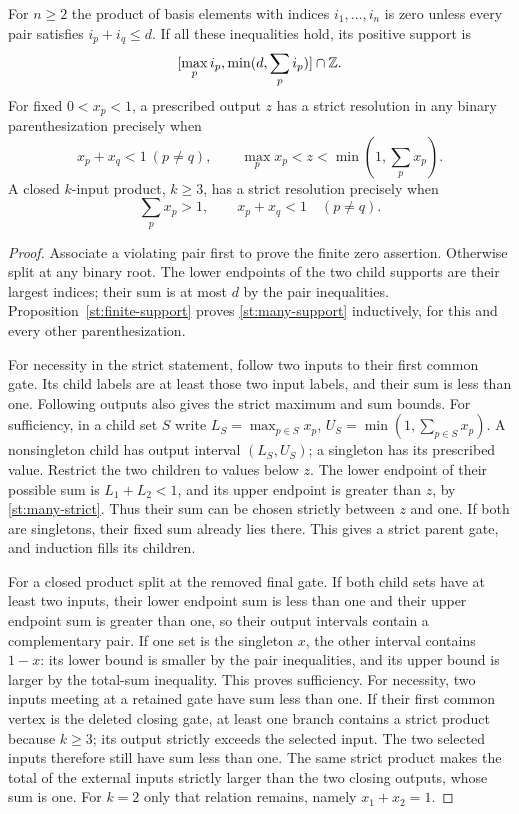\begin{lemma}\label{st:hub-support}
For $n\ge2$ the product of basis elements with indices $i_1,\ldots,i_n$
is zero unless every pair satisfies $i_p+i_q\le d$. If all
these inequalities hold, its positive support is
\begin{equation}\label{st:many-support}
 [\max_p i_p,\min(d,\sum_p i_p)]\cap\mathbb Z.
\end{equation}
For fixed $0<x_p<1$, a prescribed output $z$ has a strict
resolution in any binary parenthesization precisely when
\begin{equation}\label{st:many-strict}
 x_p+x_q<1\ (p\ne q),\qquad
 \max_p x_p<z<\min(1,\sum_p x_p).
\end{equation}
A closed $k$-input product, $k\ge3$, has a strict resolution
precisely when
\begin{equation}\label{st:closed-hub}
 \sum_p x_p>1,\qquad x_p+x_q<1\quad(p\ne q).
\end{equation}
\end{lemma}
\begin{proof}
Associate a violating pair first to prove the finite zero
assertion. Otherwise split at any binary root. The lower
endpoints of the two child supports are their largest indices;
their sum is at most $d$ by the pair inequalities.
Proposition~\ref{st:finite-support} proves
\eqref{st:many-support} inductively, for this and every other
parenthesization.

For necessity in the strict statement, follow two inputs to
their first common gate. Its child labels are at least those
two input labels, and their sum is less than one. Following
outputs also gives the strict maximum and sum bounds.
For sufficiency, in a child set $S$ write
$L_S=\max_{p\in S}x_p$, $U_S=\min(1,\sum_{p\in S}x_p)$.
A nonsingleton child has output interval $(L_S,U_S)$;
a singleton has its prescribed value. Restrict the two
children to values below $z$. The lower endpoint of their
possible sum is $L_1+L_2<1$, and its upper endpoint is greater
than $z$, by \eqref{st:many-strict}. Thus their sum can be
chosen strictly between $z$ and one. If both are singletons,
their fixed sum already lies there. This gives a strict
parent gate, and induction fills its children.

For a closed product split at the removed final gate.
If both child sets have at least two inputs, their lower
endpoint sum is less than one and their upper endpoint sum
is greater than one, so their output intervals contain a
complementary pair. If one set is the singleton $x$, the
other interval contains $1-x$: its lower bound is smaller
by the pair inequalities, and its upper bound is larger
by the total-sum inequality. This proves sufficiency.
For necessity, two inputs meeting at a retained gate
have sum less than one. If their first common vertex
is the deleted closing gate, at least one branch
contains a strict product because $k\ge3$; its
output strictly exceeds the selected input. The two
selected inputs therefore still have sum less than
one. The same strict product makes the total of
the external inputs strictly larger than the two
closing outputs, whose sum is one.
For $k=2$ only that relation
remains, namely $x_1+x_2=1$.
\end{proof}

